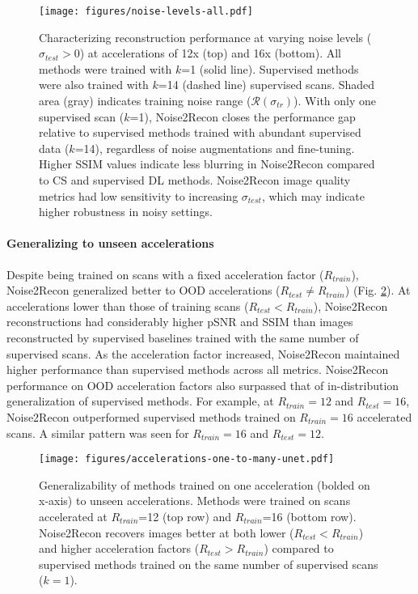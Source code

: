 \documentclass[10pt,twocolumn,letterpaper]{article}
\newcommand{\noiserange}{\mathcal{R}(\sigma_{tr})}
\newcommand{\testnoise}{\sigma_{test}}
\newcommand{\RV}[1]{{#1}}
\begin{document}
\begin{figure}[t!]
  \centering
  \begin{center}
      \texttt{[image: figures/noise-levels-all.pdf]}
  \end{center}
  \caption{Characterizing reconstruction performance at varying noise levels ($\testnoise>0$) at accelerations of 12x (top) and 16x (bottom). All methods were trained with $k$=1 (solid line). Supervised methods were also trained with $k$=14 (dashed line) supervised scans. Shaded area (gray) indicates training noise range ($\noiserange$). With only one supervised scan ($k$=1), \RV{Noise2Recon closes the performance gap relative to supervised methods trained with abundant supervised data ($k$=14), regardless of noise augmentations and fine-tuning}. Higher SSIM values indicate less blurring in Noise2Recon compared to CS and supervised DL methods. Noise2Recon image quality metrics had low sensitivity to increasing $\testnoise$, which may indicate higher robustness in noisy settings.}
  \label{fig:noisy-line-graph}
\end{figure}


\paragraph{Generalizing to unseen accelerations} Despite being trained on scans with a fixed acceleration factor ($R_{train}$), Noise2Recon generalized better to OOD accelerations ($R_{test} \neq R_{train}$) (Fig. \ref{fig:acc-one-to-many}). At accelerations lower than those of training scans ($R_{test}<R_{train}$), Noise2Recon reconstructions had considerably higher pSNR and SSIM than images reconstructed by supervised baselines trained with the same number of supervised scans. As the acceleration factor increased, Noise2Recon maintained higher performance than supervised methods across all metrics. Noise2Recon performance on OOD acceleration factors also surpassed that of in-distribution generalization of supervised methods. For example, at $R_{train}=12$ and $R_{test}=16$, Noise2Recon outperformed supervised methods trained on $R_{train}=16$ accelerated scans. A similar pattern was seen for $R_{train}=16$ and $R_{test}=12$.

\begin{figure}[t!]
    \centering
    \begin{center}
        \texttt{[image: figures/accelerations-one-to-many-unet.pdf]}
    \end{center}
    \caption{Generalizability of methods trained on one acceleration (bolded on x-axis) to unseen accelerations. Methods were trained on scans accelerated at $R_{train}$=12 (top row) and $R_{train}$=16 (bottom row). Noise2Recon recovers images better at both lower ($R_{test}<R_{train}$) and higher acceleration factors ($R_{test}>R_{train}$) compared to supervised methods trained on the same number of supervised scans ($k=1$).}
    \label{fig:acc-one-to-many}
\end{figure}
\end{document}

